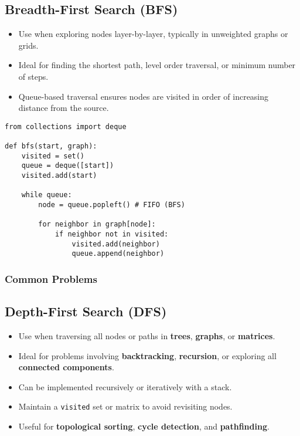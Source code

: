 \newpage


\subsection{Breadth-First Search (BFS)}
\begin{summary}
    \begin{itemize}
        \item Use when exploring nodes layer-by-layer, typically in unweighted graphs or grids.
        \item Ideal for finding the shortest path, level order traversal, or minimum number of steps.
        \item Queue-based traversal ensures nodes are visited in order of increasing distance from the source.
    \end{itemize}
\end{summary}

\begin{algo}
\begin{lstlisting}
from collections import deque

def bfs(start, graph):
    visited = set()
    queue = deque([start])
    visited.add(start)

    while queue:
        node = queue.popleft() # FIFO (BFS)

        for neighbor in graph[node]:
            if neighbor not in visited:
                visited.add(neighbor)
                queue.append(neighbor)
\end{lstlisting}
\end{algo}
\newpage

\subsubsection{Common Problems}
\begin{summary}
\end{summary}
\newpage

\subsection{Depth-First Search (DFS)}

\begin{summary}
    \begin{itemize}
        \item Use when traversing all nodes or paths in \textbf{trees}, \textbf{graphs}, or \textbf{matrices}.
        \item Ideal for problems involving \textbf{backtracking}, \textbf{recursion}, or exploring all \textbf{connected components}.
        \item Can be implemented recursively or iteratively with a stack.
        \item Maintain a \texttt{visited} set or matrix to avoid revisiting nodes.
        \item Useful for \textbf{topological sorting}, \textbf{cycle detection}, and \textbf{pathfinding}.
    \end{itemize}
\end{summary}

